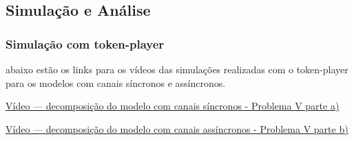 \subsection{Simulação e Análise}

\subsubsection{Simulação com token-player}

abaixo estão os links para os vídeos das simulações realizadas com o token-player para os modelos com canais síncronos e assíncronos.

\vspace{1em}

\href{https://unlpt-my.sharepoint.com/:v:/g/personal/jafe_lopes_fct_unl_pt/ESR4w4p0PK9CgxJYC0eDlT8BZZrfzpxHBbuzyL5D78P0Gg?nav=eyJyZWZlcnJhbEluZm8iOnsicmVmZXJyYWxBcHAiOiJPbmVEcml2ZUZvckJ1c2luZXNzIiwicmVmZXJyYWxBcHBQbGF0Zm9ybSI6IldlYiIsInJlZmVycmFsTW9kZSI6InZpZXciLCJyZWZlcnJhbFZpZXciOiJNeUZpbGVzTGlua0NvcHkifX0&e=liF1mC}{Vídeo — decomposição do modelo com canais síncronos - Problema V parte a)}

\href{https://unlpt-my.sharepoint.com/:v:/g/personal/jafe_lopes_fct_unl_pt/EWEOa2jxXRNFmaCiO5c6iG4BP21vyCbQSKYiZQ8HcoeOrg?nav=eyJyZWZlcnJhbEluZm8iOnsicmVmZXJyYWxBcHAiOiJPbmVEcml2ZUZvckJ1c2luZXNzIiwicmVmZXJyYWxBcHBQbGF0Zm9ybSI6IldlYiIsInJlZmVycmFsTW9kZSI6InZpZXciLCJyZWZlcnJhbFZpZXciOiJNeUZpbGVzTGlua0NvcHkifX0&e=j6h8N4}{Vídeo — decomposição do modelo com canais assíncronos - Problema V parte b)}
